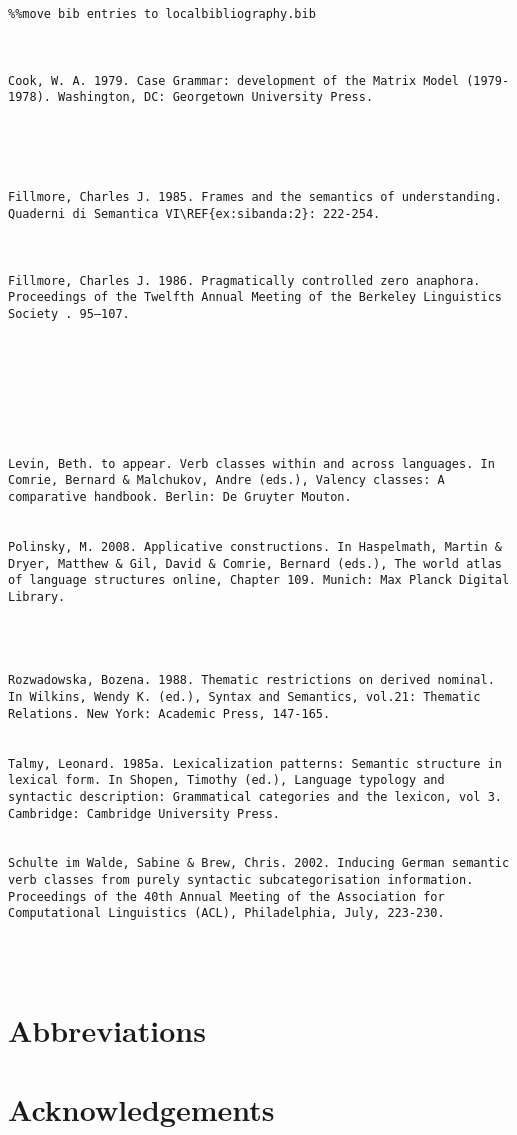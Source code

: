 \documentclass[output=paper]{langsci/langscibook}
\begin{document}
\begin{verbatim}%%move bib entries to localbibliography.bib



Cook, W. A. 1979. Case Grammar: development of the Matrix Model (1979-1978). Washington, DC: Georgetown University Press.





Fillmore, Charles J. 1985. Frames and the semantics of understanding. Quaderni di Semantica VI\REF{ex:sibanda:2}: 222-254.



Fillmore, Charles J. 1986. Pragmatically controlled zero anaphora. Proceedings of the Twelfth Annual Meeting of the Berkeley Linguistics Society . 95–107.








Levin, Beth. to appear. Verb classes within and across languages. In Comrie, Bernard & Malchukov, Andre (eds.), Valency classes: A comparative handbook. Berlin: De Gruyter Mouton.


Polinsky, M. 2008. Applicative constructions. In Haspelmath, Martin & Dryer, Matthew & Gil, David & Comrie, Bernard (eds.), The world atlas of language structures online, Chapter 109. Munich: Max Planck Digital Library.




Rozwadowska, Bozena. 1988. Thematic restrictions on derived nominal. In Wilkins, Wendy K. (ed.), Syntax and Semantics, vol.21: Thematic Relations. New York: Academic Press, 147-165.


Talmy, Leonard. 1985a. Lexicalization patterns: Semantic structure in lexical form. In Shopen, Timothy (ed.), Language typology and syntactic description: Grammatical categories and the lexicon, vol 3. Cambridge: Cambridge University Press.


Schulte im Walde, Sabine & Brew, Chris. 2002. Inducing German semantic verb classes from purely syntactic subcategorisation information. Proceedings of the 40th Annual Meeting of the Association for Computational Linguistics (ACL), Philadelphia, July, 223-230.




\end{verbatim}

\section*{Abbreviations}
\section*{Acknowledgements}

\printbibliography[heading=subbibliography,notkeyword=this]
\end{document}

